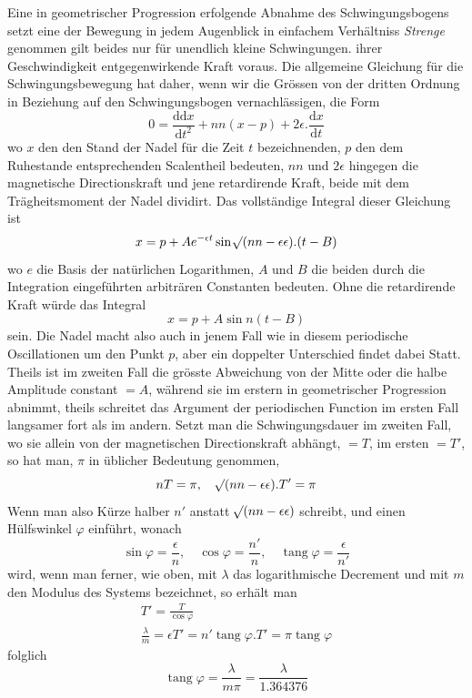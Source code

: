 Eine in geometrischer Progression erfolgende Abnahme des Schwingungsbogens setzt eine der Bewegung in jedem Augenblick in einfachem Verhältniss
\expandafter\def\csname HistoricalNoteText395\endcsname{\textit{Strenge} genommen gilt beides nur für unendlich kleine Schwingungen.}%
ihrer Geschwindigkeit entgegenwirkende Kraft voraus. Die allgemeine Gleichung für die Schwingungsbewegung hat daher, wenn wir die Grössen von der dritten Ordnung in Beziehung auf den Schwingungsbogen vernachlässigen, die Form
\[
0=\frac{\mathrm{d}\mathrm{d}x}{\mathrm{d}t^2}+nn(x-p)+2\epsilon.\frac{\mathrm{d}x}{\mathrm{d}t}
\]
wo $x$ den den Stand der Nadel für die Zeit $t$ bezeichnenden, $p$ den dem Ruhestande entsprechenden Scalentheil bedeuten, $nn$ und $2\epsilon$ hingegen die magnetische Directionskraft und jene retardirende Kraft, beide mit dem Trägheitsmoment der Nadel dividirt. Das vollständige Integral dieser Gleichung ist
\[
x=p+Ae^{-\epsilon t}\sin\mathord{{}^{}\!\surd}(nn-\epsilon\epsilon).(t-B)
\]
wo $e$ die Basis der natürlichen Logarithmen, $A$ und $B$ die beiden durch die Integration eingeführten arbiträren Constanten bedeuten. Ohne die retardirende Kraft würde das Integral
\[
x=p+A\sin n(t-B)
\]
sein. Die Nadel macht also auch in jenem Fall wie in diesem periodische Oscillationen um den Punkt $p$, aber ein doppelter Unterschied findet dabei Statt. Theils ist im zweiten Fall die grösste Abweichung von der Mitte oder die halbe Amplitude constant $=A$, während sie im erstern in geometrischer Progression abnimmt, theils schreitet das Argument der periodischen Function im ersten Fall langsamer fort als im andern. Setzt man die Schwingungsdauer im zweiten Fall, wo sie allein von der magnetischen Directionskraft abhängt, $=T$, im ersten $=T'$, so hat man, $\pi$ in üblicher Bedeutung genommen,
\[
nT=\pi,\quad \mathord{{}^{}\!\surd}(nn-\epsilon\epsilon).T'=\pi
\]
Wenn man also Kürze halber $n'$ anstatt $\mathord{{}^{}\!\surd}(nn-\epsilon\epsilon)$ schreibt, und einen Hülfswinkel $\varphi$ einführt, wonach
\[
\sin\varphi=\frac{\epsilon}{n},\quad \cos\varphi=\frac{n'}{n},\quad \operatorname{tang}\varphi=\frac{\epsilon}{n'}
\]
wird, wenn man ferner, wie oben, mit $\lambda$ das logarithmische Decrement und mit
$m$ den Modulus des Systems bezeichnet, so erhält man
\[
\begin{gathered}
T'=\frac{T}{\cos\varphi}\\
\frac{\lambda}{m}=\epsilon T'=n'\operatorname{tang}\varphi.T'=\pi\operatorname{tang}\varphi
\end{gathered}
\]
folglich
\[
\operatorname{tang}\varphi=\frac{\lambda}{m\pi}=\frac{\lambda}{1.364376}
\]
